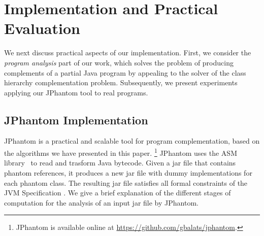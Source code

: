 \section{Implementation and Practical Evaluation}
\label{jphantom}

We next discuss practical aspects of our implementation. First, we
consider the \emph{program analysis} part of our work, which solves
the problem of producing complements of a partial Java program by
appealing to the solver of the class hierarchy complementation
problem. Subsequently, we present experiments applying our JPhantom
tool to real programs.

\subsection{JPhantom Implementation}

JPhantom is a practical and scalable tool for program complementation,
based on the algorithms we have presented in this
paper. \footnote{JPhantom is available online at
  \url{https://github.com/gbalats/jphantom}.} JPhantom uses the ASM
library~\cite{Bruneton02asm:a} to read and trasform Java
bytecode. Given a jar file that contains phantom references, it
produces a new jar file with dummy implementations for each phantom
class. The resulting jar file satisfies all formal constraints of the
JVM Specification \cite{Lindholm:1999:JVM:553607}. We
give a brief explanation of the different stages of computation for
the analysis of an input jar file by JPhantom.



